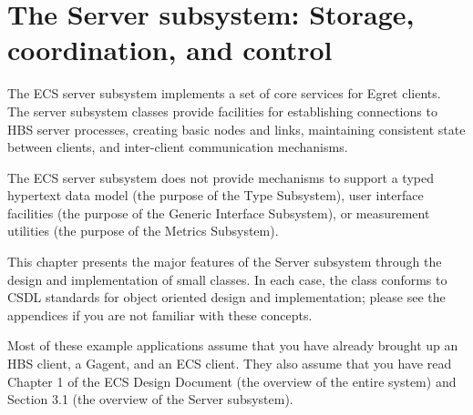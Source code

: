 
\setcounter{chapter}{1}   %
\chapter{The Server subsystem: Storage, coordination, and control}

The ECS server subsystem implements a set of core services for Egret
clients.  The server subsystem classes provide facilities for establishing
connections to HBS server processes, creating basic nodes and links,
maintaining consistent state between clients, and inter-client communication
mechanisms.

The ECS server subsystem does not provide mechanisms to support a typed
hypertext data model (the purpose of the Type Subsystem), user interface 
facilities (the purpose of the Generic Interface Subsystem), or 
measurement utilities (the purpose of the Metrics Subsystem). 

This chapter presents the major features of the Server subsystem through
the design and implementation of small classes.  In each case, the class
conforms to CSDL standards for object oriented design and implementation;
please see the appendices if you are not familiar with these concepts.

Most of these example applications assume that you have already brought up
an HBS client, a Gagent, and an ECS client.  They also assume that you have
read Chapter 1 of the ECS Design Document (the overview of the entire
system) and Section 3.1 (the overview of the Server subsystem).












